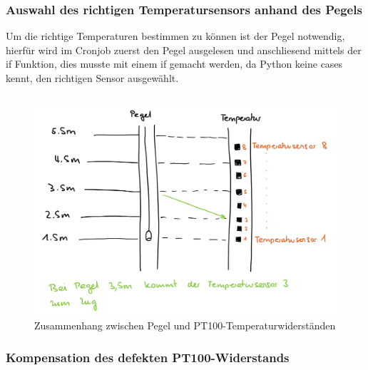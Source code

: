 \subsubsection*{Auswahl des richtigen Temperatursensors anhand des Pegels}
\newline
{}\newline
Um die richtige Temperaturen bestimmen zu können ist der Pegel notwendig, hierfür wird im Cronjob zuerst den Pegel ausgelesen und anschliesend mittels der if Funktion, dies musste mit einem if gemacht werden, da Python keine cases kennt, den richtigen Sensor ausgewählt.

\begin{lstlisting}

\end{lstlisting}

\begin{figure}[h]
	\centering
	\includegraphics[width=0.9\linewidth]{img/wassertempsensoren.png}
	\caption{Zusammenhang zwischen Pegel und PT100-Temperaturwiderständen}
	\label{img:wassertempsensoren}
\end{figure}


\subsubsection*{Kompensation des defekten PT100-Widerstands}
\newline
{}\newline
{}\newline









